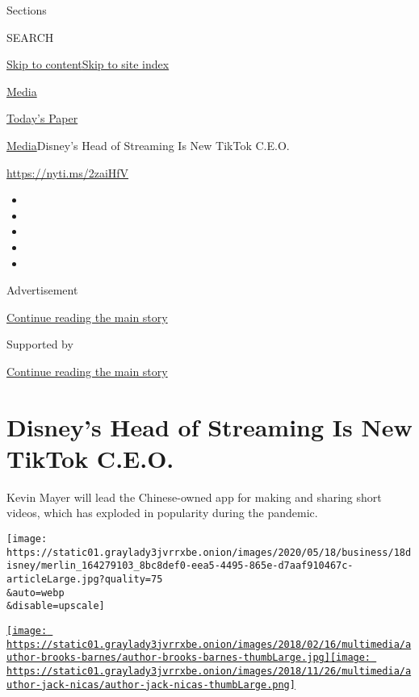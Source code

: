 Sections

SEARCH

\protect\hyperlink{site-content}{Skip to
content}\protect\hyperlink{site-index}{Skip to site index}

\href{https://www.nytimes3xbfgragh.onion/section/business/media}{Media}

\href{https://myaccount.nytimes3xbfgragh.onion/auth/login?response_type=cookie\&client_id=vi}{}

\href{https://www.nytimes3xbfgragh.onion/section/todayspaper}{Today's
Paper}

\href{/section/business/media}{Media}\textbar{}Disney's Head of
Streaming Is New TikTok C.E.O.

\url{https://nyti.ms/2zaiHfV}

\begin{itemize}
\item
\item
\item
\item
\item
\end{itemize}

Advertisement

\protect\hyperlink{after-top}{Continue reading the main story}

Supported by

\protect\hyperlink{after-sponsor}{Continue reading the main story}

\hypertarget{disneys-head-of-streaming-is-new-tiktok-ceo}{%
\section{Disney's Head of Streaming Is New TikTok
C.E.O.}\label{disneys-head-of-streaming-is-new-tiktok-ceo}}

Kevin Mayer will lead the Chinese-owned app for making and sharing short
videos, which has exploded in popularity during the pandemic.

\texttt{[image: https://static01.graylady3jvrrxbe.onion/images/2020/05/18/business/18disney/merlin\_164279103\_8bc8def0-eea5-4495-865e-d7aaf910467c-articleLarge.jpg?quality=75\\\&auto=webp\\\&disable=upscale]}

\href{https://www.nytimes3xbfgragh.onion/by/brooks-barnes}{\texttt{[image: https://static01.graylady3jvrrxbe.onion/images/2018/02/16/multimedia/author-brooks-barnes/author-brooks-barnes-thumbLarge.jpg]}}\href{https://www.nytimes3xbfgragh.onion/by/jack-nicas}{\texttt{[image: https://static01.graylady3jvrrxbe.onion/images/2018/11/26/multimedia/author-jack-nicas/author-jack-nicas-thumbLarge.png]}}


